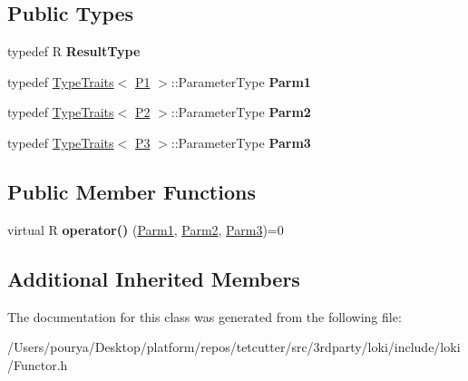 \subsection*{Public Types}
\begin{DoxyCompactItemize}
\item 
\hypertarget{classLoki_1_1FunctorImpl_3_01R_00_01Seq_3_01P1_00_01P2_00_01P3_01_4_00_01ThreadingModel_01_4_abd586dc69872bd7115bd23b977c907b0}{}typedef R {\bfseries Result\+Type}\label{classLoki_1_1FunctorImpl_3_01R_00_01Seq_3_01P1_00_01P2_00_01P3_01_4_00_01ThreadingModel_01_4_abd586dc69872bd7115bd23b977c907b0}

\item 
\hypertarget{classLoki_1_1FunctorImpl_3_01R_00_01Seq_3_01P1_00_01P2_00_01P3_01_4_00_01ThreadingModel_01_4_a497a736343f50fc73a75ae93b0abd6ee}{}typedef \hyperlink{classLoki_1_1TypeTraits}{Type\+Traits}$<$ \hyperlink{structP1}{P1} $>$\+::Parameter\+Type {\bfseries Parm1}\label{classLoki_1_1FunctorImpl_3_01R_00_01Seq_3_01P1_00_01P2_00_01P3_01_4_00_01ThreadingModel_01_4_a497a736343f50fc73a75ae93b0abd6ee}

\item 
\hypertarget{classLoki_1_1FunctorImpl_3_01R_00_01Seq_3_01P1_00_01P2_00_01P3_01_4_00_01ThreadingModel_01_4_a5017239e5edb77f3a84409e4a0aed245}{}typedef \hyperlink{classLoki_1_1TypeTraits}{Type\+Traits}$<$ \hyperlink{structP2}{P2} $>$\+::Parameter\+Type {\bfseries Parm2}\label{classLoki_1_1FunctorImpl_3_01R_00_01Seq_3_01P1_00_01P2_00_01P3_01_4_00_01ThreadingModel_01_4_a5017239e5edb77f3a84409e4a0aed245}

\item 
\hypertarget{classLoki_1_1FunctorImpl_3_01R_00_01Seq_3_01P1_00_01P2_00_01P3_01_4_00_01ThreadingModel_01_4_a193ce582c3fa6d8b26b8c71c05de273d}{}typedef \hyperlink{classLoki_1_1TypeTraits}{Type\+Traits}$<$ \hyperlink{structP3}{P3} $>$\+::Parameter\+Type {\bfseries Parm3}\label{classLoki_1_1FunctorImpl_3_01R_00_01Seq_3_01P1_00_01P2_00_01P3_01_4_00_01ThreadingModel_01_4_a193ce582c3fa6d8b26b8c71c05de273d}

\end{DoxyCompactItemize}
\subsection*{Public Member Functions}
\begin{DoxyCompactItemize}
\item 
\hypertarget{classLoki_1_1FunctorImpl_3_01R_00_01Seq_3_01P1_00_01P2_00_01P3_01_4_00_01ThreadingModel_01_4_a49c7ac876e348b03232d8a3d2e8f95f1}{}virtual R {\bfseries operator()} (\hyperlink{classLoki_1_1EmptyType}{Parm1}, \hyperlink{classLoki_1_1EmptyType}{Parm2}, \hyperlink{classLoki_1_1EmptyType}{Parm3})=0\label{classLoki_1_1FunctorImpl_3_01R_00_01Seq_3_01P1_00_01P2_00_01P3_01_4_00_01ThreadingModel_01_4_a49c7ac876e348b03232d8a3d2e8f95f1}

\end{DoxyCompactItemize}
\subsection*{Additional Inherited Members}


The documentation for this class was generated from the following file\+:\begin{DoxyCompactItemize}
\item 
/\+Users/pourya/\+Desktop/platform/repos/tetcutter/src/3rdparty/loki/include/loki/Functor.\+h\end{DoxyCompactItemize}
